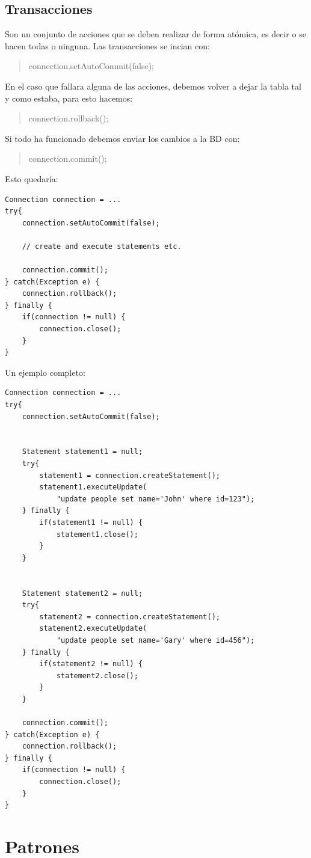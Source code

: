 \documentclass[4paper]{article}
\begin{document}
\subsection{Transacciones}
Son un conjunto de acciones que se deben realizar de forma atómica, es decir o se hacen todas o ninguna. Las transacciones se incian con:
\begin{quote}
connection.setAutoCommit(false);
\end{quote}
En el caso que fallara alguna de las acciones, debemos volver a dejar la tabla tal y como estaba, para esto hacemos:
\begin{quote}
connection.rollback();
\end{quote}
Si todo ha funcionado debemos enviar los cambios a la BD con:
\begin{quote}
connection.commit();
\end{quote}
Esto quedaría:
\begin{lstlisting}
Connection connection = ...
try{
    connection.setAutoCommit(false);

    // create and execute statements etc.

    connection.commit();
} catch(Exception e) {
    connection.rollback();
} finally {
    if(connection != null) {
        connection.close();
    }
}
\end{lstlisting}
\newpage
Un ejemplo completo:
\begin{lstlisting}
Connection connection = ...
try{
    connection.setAutoCommit(false);


    Statement statement1 = null;
    try{
        statement1 = connection.createStatement();
        statement1.executeUpdate(
            "update people set name='John' where id=123");
    } finally {
        if(statement1 != null) {
            statement1.close();
        }
    }


    Statement statement2 = null;
    try{
        statement2 = connection.createStatement();
        statement2.executeUpdate(
            "update people set name='Gary' where id=456");
    } finally {
        if(statement2 != null) {
            statement2.close();
        }
    }

    connection.commit();
} catch(Exception e) {
    connection.rollback();
} finally {
    if(connection != null) {
        connection.close();
    }
}
\end{lstlisting}

\section{Patrones}
\end{document}
